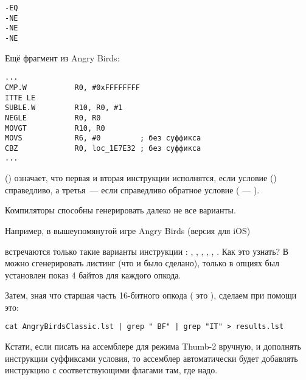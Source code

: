 \begin{lstlisting}
-EQ
-NE
-NE
-NE
\end{lstlisting}

Ещё фрагмент из Angry Birds:

\begin{lstlisting}[caption=Angry Birds Classic,style=customasmARM]
...
CMP.W           R0, #0xFFFFFFFF
ITTE LE
SUBLE.W         R10, R0, #1
NEGLE           R0, R0
MOVGT           R10, R0
MOVS            R6, #0         ; без суффикса
CBZ             R0, loc_1E7E32 ; без суффикса
...
\end{lstlisting}

 () 
означает, что первая и вторая инструкции исполнятся, если условие  ()
справедливо, а третья~--- если справедливо обратное условие ( --- ).

Компиляторы способны генерировать далеко не все варианты.

Например, в вышеупомянутой игре Angry Birds (версия  для iOS)

встречаются только такие варианты инструкции : 
, , , , , .
\myindex{\GrepUsage}
Как это узнать?
В \IDA можно сгенерировать листинг (что и было сделано), только в опциях был установлен показ 4 байтов для каждого опкода.

Затем, зная что старшая часть 16-битного опкода ( это ), сделаем при помощи  это:

\begin{lstlisting}
cat AngryBirdsClassic.lst | grep " BF" | grep "IT" > results.lst
\end{lstlisting}

Кстати, если писать на ассемблере для режима Thumb-2 вручную, и дополнять инструкции суффиксами
условия, то ассемблер автоматически будет добавлять инструкцию  с соответствующими флагами там,
где надо.

\myparagraph{\NonOptimizingXcodeIV (\ARMMode)}

